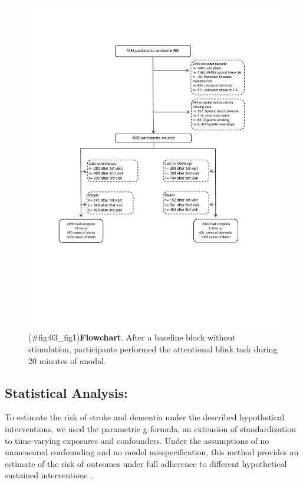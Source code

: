 \documentclass[
]{book}
\begin{document}
\begin{figure}
\centering
\includegraphics{figs/03_fig1.pdf}
\caption{(\#fig:03\_fig1)\textbf{Flowchart}. After a baseline block without stimulation, participants performed the attentional blink task during 20 minutes of anodal.}
\end{figure}



\hypertarget{statistical-analysis}{%
\subsection{Statistical Analysis:}\label{statistical-analysis}}

To estimate the risk of stroke and dementia under the described hypothetical interventions, we used the parametric g-formula, an extension of standardization to time-varying exposures and confounders. Under the assumptions of no unmeasured confounding and no model misspecification, this method provides an estimate of the risk of outcomes under full adherence to different hypothetical sustained interventions \autocite{taubman2009,garcia-aymerich2014,danaei_epid2013,vangenlonne2018,dickerman2019}.
\end{document}
